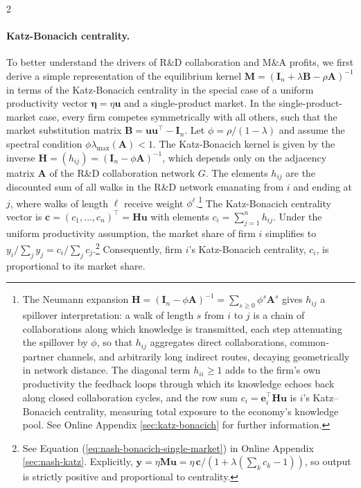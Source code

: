 \documentclass[12pt]{article}
\begin{document}
\begin{spacing}{2}
\paragraph{Katz-Bonacich centrality.} To better understand the drivers of R\&D collaboration and M\&A profits, we first derive a simple representation of the equilibrium kernel $\mathbf{M} = (\mathbf{I}_n+\lambda\mathbf{B}-\rho\mathbf{A})^{-1}$ in terms of the Katz-Bonacich centrality \citep[cf.][]{Katz1953,ballester06:_who_networ} in the special case of a uniform productivity vector $\bm{\eta}=\eta \mathbf{u}$ and a single-product market.
In the single-product-market case, every firm competes symmetrically with all others, such that the market substitution matrix $\mathbf{B} = \mathbf{u}\mathbf{u}^\top - \mathbf{I}_n$. Let $\phi = \rho / (1-\lambda)$ and assume the spectral condition $\phi\lambda_{\max}(\mathbf{A})<1$. The Katz-Bonacich kernel is given by the inverse $\mathbf{H} = (h_{ij}) = (\mathbf{I}_n-\phi\mathbf{A})^{-1}$, which depends only on the adjacency matrix $\mathbf{A}$ of the R\&D collaboration network $G$. The elements $h_{ij}$ are the discounted sum of all walks in the R\&D network emanating from $i$ and ending at $j$, where walks of length $\ell$ receive weight $\phi^\ell$.\footnote{\label{foot:neumann}The Neumann expansion $\mathbf{H}=(\mathbf{I}_n-\phi\mathbf{A})^{-1}=\sum_{s\ge
0}\phi^{s}\mathbf{A}^{s}$ gives $h_{ij}$ a spillover interpretation: a walk of
length $s$ from $i$ to $j$ is a chain of collaborations along which knowledge
is transmitted, each step attenuating the spillover by $\phi$, so that $h_{ij}$
aggregates direct collaborations, common-partner channels, and arbitrarily long
indirect routes, decaying geometrically in network distance. The diagonal term
$h_{ii}\ge 1$ adds to the firm's own productivity the feedback loops through
which its knowledge echoes back along closed collaboration cycles, and the row
sum $c_i=\mathbf{e}_i^{\top}\mathbf{H}\mathbf{u}$ is $i$'s Katz--Bonacich
centrality, measuring total exposure to the economy's knowledge pool. See Online Appendix \ref{sec:katz-bonacich} for further information.} The Katz-Bonacich centrality vector is $\mathbf{c}=(c_1,\ldots,c_n)^\top = \mathbf{H}\mathbf{u}$ with elements $c_i = \sum_{j=1}^n h_{ij}$. Under the uniform productivity assumption, the market share of firm $i$ simplifies to $y_i/\sum_j y_j = c_i/\sum_j c_j$.\footnote{See Equation (\ref{eq:nash-bonacich-single-market}) in Online Appendix \ref{sec:nash-katz}. Explicitly, $\mathbf{y} = \eta\mathbf{M}\mathbf{u} = \eta\,\mathbf{c}/\!\left(1+\lambda\left(\sum_k c_k - 1\right)\right)$, so output is strictly positive and proportional to centrality.} Consequently, firm $i$'s Katz-Bonacich centrality, $c_i$, is proportional to its market share.


\end{spacing}
\end{document}
